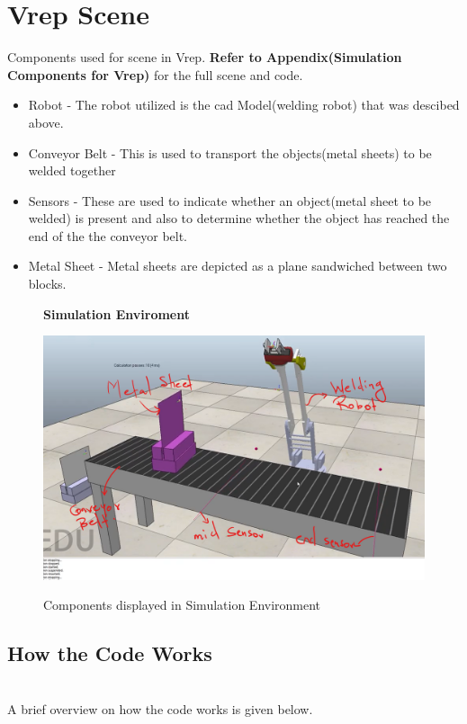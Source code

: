 \documentclass[12pt]{article}
\begin{document}
  \section{Vrep Scene}
   Components used for scene in Vrep.
   \textbf{Refer to Appendix(Simulation Components for Vrep)} for the full scene and code.
   \begin{itemize}
     \item Robot - The robot utilized is the cad Model(welding robot) that was descibed above.  
     \item Conveyor Belt - This is used to transport the objects(metal sheets) to be welded  together
     \item Sensors - These are used to indicate whether an object(metal sheet to be welded) is present
                     and also to determine whether the object has reached the end of the the conveyor belt.
     \item Metal Sheet - Metal sheets are depicted as a plane sandwiched between two blocks.
   \end{itemize}
   \begin{figure}[H]
    \centering
    \textbf{Simulation Enviroment}\par\medskip
    \includegraphics[scale = 0.5]{simenv.png}\\[0.0 cm]	%
    \caption{Components displayed in Simulation Environment}
   \end{figure} 
  \subsection{How the Code Works} \\
  A brief overview on how the code works is given below. 
  
\end{document}
